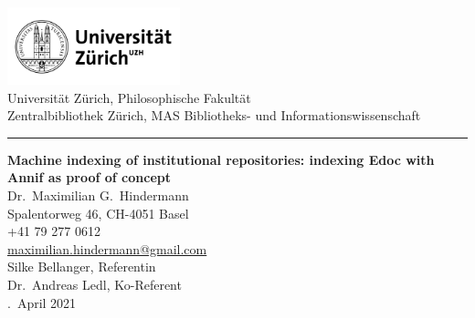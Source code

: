 \newpage
\thispagestyle{empty}
\large
\begin{center}
	\includegraphics[width=5cm]{./logo.png}\\[.5cm]
	Universität Zürich, Philosophische Fakultät\\[.25cm]
 	Zentralbibliothek Zürich, MAS Bibliotheks- und Informationswissenschaft\\[1cm]
	\hrule
	\vspace{2cm}
	\flushleft
	\textbf{\LARGE Machine indexing of institutional repositories: indexing Edoc with Annif as proof of concept}\\[2cm]
	 Dr.\ Maximilian G.\ Hindermann\\
	Spalentorweg 46, CH-4051 Basel\\
	+41 79 277 0612\\
	\href{mailto:maximilian.hindermann@gmail.com}{maximilian.hindermann@gmail.com}\\
	\vspace{1cm}
	\flushleft
	 Silke Bellanger, Referentin\\[.25cm]
	 Dr.\ Andreas Ledl, Ko-Referent\\
	\vfill
	.\ April 2021
\end{center}
\normalfont
\normalsize